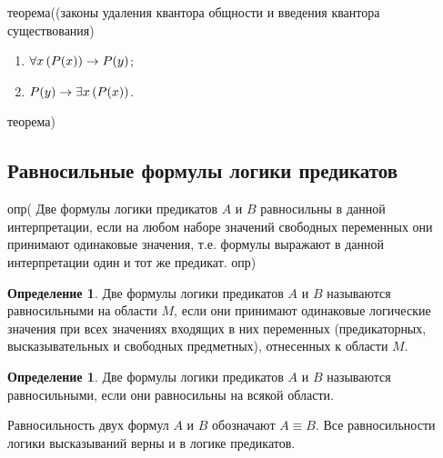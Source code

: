 \documentclass[letterpaper, 10pt]{article}
\theoremstyle{definition}
\newtheorem{define}[thm]{Определение}
\begin{document}
	теорема((законы удаления квантора общности и введения квантора
	существования)
	\begin{enumerate}
		\item $\forall x\, (P(x)) \rightarrow P(y)$;
		\item $P(y) \rightarrow \exists x\, (P(x))$.
	\end{enumerate}
	теорема)
	
	

	\subsection{Равносильные формулы логики предикатов}

	опр(
	Две формулы логики предикатов $A$ и $B$ равносильны в данной интерпретации,
	если на любом наборе значений свободных переменных они принимают одинаковые
	значения, т.е. формулы выражают в данной интерпретации один и тот же
	предикат.
	опр)

	\begin{define}
		Две формулы логики предикатов $A$ и $B$ называются равносильными на
		области $M$, если они принимают одинаковые логические значения при всех
		значениях входящих в них переменных (предикаторных, высказывательных и
		свободных предметных), отнесенных к области $M$.
	\end{define}

	\begin{define}
		Две формулы логики предикатов $A$ и $B$ называются равносильными, если
		они равносильны на всякой области.
	\end{define}

	Равносильность двух формул $A$ и $B$ обозначают $A \equiv B$.
	Все равносильности логики высказываний верны и в логике предикатов. 
\end{document}
